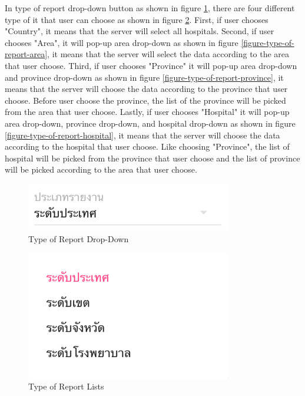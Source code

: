     In type of report drop-down button as shown in figure \ref{figure-type-of-report-drop-down}, there are four different type of it that user can choose as shown in figure \ref{figure-type-of-report-lists}. First, if user chooses "Country", it means that the server will select all hospitals. Second, if user chooses "Area", it will pop-up area drop-down as shown in figure \ref{figure-type-of-report-area}, it means that the server will select the data according to the area that user choose. Third, if user chooses "Province" it will pop-up area drop-down and province drop-down  as shown in figure \ref{figure-type-of-report-province}, it means that the server will choose the data according to the province that user choose. Before user choose the province, the list of the province will be picked from the area that user choose. Lastly, if user chooses "Hospital" it will pop-up area drop-down, province drop-down, and hospital drop-down  as shown in figure \ref{figure-type-of-report-hospital}, it means that the server will choose the data according to the hospital that user choose. Like choosing "Province", the list of hospital will be picked from the province that user choose and the list of province will be picked according to the area that user choose.

    

    \FloatBarrier
        \begin{figure}[h!]
            \centering
        		\includegraphics[width=9cm]{images/chapter-06/type-of-report-all.png}
            	\caption{Type of Report Drop-Down}
        		\label{figure-type-of-report-drop-down}
        \end{figure}
    \FloatBarrier
    
    \FloatBarrier
        \begin{figure}[h!]
            \centering
        		\includegraphics[width=9cm]{images/chapter-06/type-of-report-lists.png}
            	\caption{Type of Report Lists}
        		\label{figure-type-of-report-lists}
        \end{figure}
    \FloatBarrier
    
